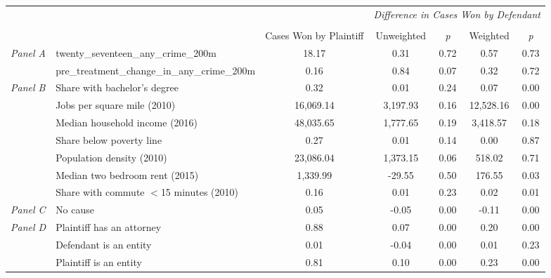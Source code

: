 \begin{tabular}{llccccc}
\toprule
 &  & \textit{} & \multicolumn{4}{c}{\textit{Difference in Cases Won by Defendant}} \\
\cline{4-7}
\\
 &  & Cases Won by Plaintiff & Unweighted & \emph{p} & Weighted & \emph{p} \\
\midrule
\multirow[c]{2}{3cm}{\textit{Panel A}} & twenty_seventeen_any_crime_200m & 18.17 & 0.31 & 0.72 & 0.57 & 0.73 \\
 & pre_treatment_change_in_any_crime_200m & 0.16 & 0.84 & 0.07 & 0.32 & 0.72 \\
\cline{1-7}
\multirow[c]{7}{3cm}{\textit{Panel B}} & Share with bachelor's degree & 0.32 & 0.01 & 0.24 & 0.07 & 0.00 \\
 & Jobs per square mile (2010) & 16,069.14 & 3,197.93 & 0.16 & 12,528.16 & 0.00 \\
 & Median household income (2016) & 48,035.65 & 1,777.65 & 0.19 & 3,418.57 & 0.18 \\
 & Share below poverty line & 0.27 & 0.01 & 0.14 & 0.00 & 0.87 \\
 & Population density (2010) & 23,086.04 & 1,373.15 & 0.06 & 518.02 & 0.71 \\
 & Median two bedroom rent (2015) & 1,339.99 & -29.55 & 0.50 & 176.55 & 0.03 \\
 & Share with commute $<$15 minutes (2010) & 0.16 & 0.01 & 0.23 & 0.02 & 0.01 \\
\cline{1-7}
\textit{Panel C} & No cause & 0.05 & -0.05 & 0.00 & -0.11 & 0.00 \\
\cline{1-7}
\multirow[c]{3}{3cm}{\textit{Panel D}} & Plaintiff has an attorney & 0.88 & 0.07 & 0.00 & 0.20 & 0.00 \\
 & Defendant is an entity & 0.01 & -0.04 & 0.00 & 0.01 & 0.23 \\
 & Plaintiff is an entity & 0.81 & 0.10 & 0.00 & 0.23 & 0.00 \\
\cline{1-7}
\bottomrule
\end{tabular}
